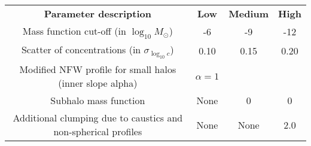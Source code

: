 \begin{table}
    \begin{tabular}{ c c c c }
    \textbf{Parameter description}  & \textbf{Low} & \textbf{Medium} & \textbf{High} \\
    Mass function cut-off (in $\log_{10}M_\odot$)        & -6 & -9 & -12 \\
    Scatter of concentrations (in $\sigma_{\log_{10}c}$)              & 0.10 & 0.15 & 0.20 \\
    Modified NFW profile for small halos (inner slope alpha) & $\alpha=1$ & \cite{Ishiyama_2014} &  \cite{Ishiyama_2014} \\
    Subhalo mass function & None & 0 & 0 \\
    Additional clumping due to caustics and non-spherical profiles & None & None & 2.0
\\    \end{tabular}
\end{table}
